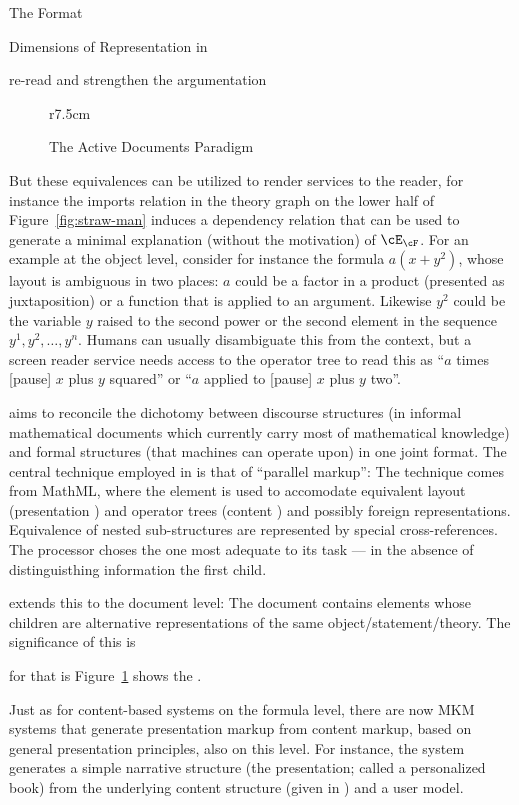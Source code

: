 \begin{omgroup}[creators=miko,id=spec-intro]{The \omdoc Format}
\begin{omgroup}[id=syntax-semantics]{Dimensions of Representation in \omdoc}
\begin{newpart}{re-read and strengthen the argumentation}
\begin{figure}r{7.5cm}\vspace*{-1em}
\caption{The Active Documents Paradigm}\label{fig:adp}\vspace*{-1em}
\end{figure}
But these equivalences can be utilized to render services to the reader, for instance the
imports relation in the theory graph on the lower half of Figure~\ref{fig:straw-man}
induces a dependency relation that can be used to generate a minimal explanation (without
the motivation) of $\cE_\cF$.  For an example at the object level, consider for instance
the formula $a(x+y^2)$, whose layout is ambiguous in two places: $a$ could be a factor in
a product (presented as juxtaposition) or a function that is applied to an
argument. Likewise $y^2$ could be the variable $y$ raised to the second power or the
second element in the sequence $y^1,y^2,\ldots,y^n$. Humans can usually disambiguate this
from the context, but a screen reader service needs access to the operator tree to read
this as ``$a$ times [pause] $x$ plus $y$ squared'' or ``$a$ applied to [pause] $x$ plus
$y$ two''.

\omdoc aims to reconcile the dichotomy between discourse structures (in informal
mathematical documents which currently carry most of mathematical knowledge) and formal
structures (that machines can operate upon) in one joint format. The central technique
employed in \omdoc is that of ``parallel markup'': The technique comes from MathML, where
the  element is used to accomodate equivalent layout (presentation
{\mathml}) and operator trees (content {\mathml}) and possibly foreign
representations. Equivalence of nested sub-structures are represented by special
cross-references.  The \mathml processor choses the one most adequate to its task --- in
the absence of distinguisthing information the first child.

\omdoc extends this to the document level: The document contains elements whose children
are alternative representations of the same object/statement/theory. The significance of this is

for that is Figure~\ref{fig:adp} shows the .


Just as for content-based systems on the formula level, there are now MKM systems that
generate presentation markup from content markup, based on general presentation
principles, also on this level. For instance, the {}
system~\cite{MelBue:krma03} generates a simple narrative structure (the
presentation; called a personalized book) from the underlying content structure (given in
\omdoc) and a user model.


\end{newpart}
\end{omgroup}
\end{omgroup}
